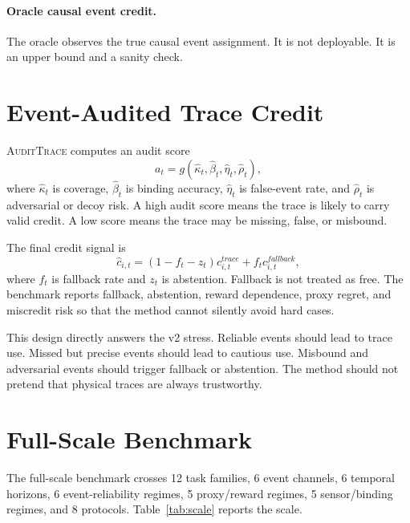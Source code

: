 \documentclass{article}
\newcommand{\method}{\textsc{AuditTrace}\xspace}
\begin{document}
\paragraph{Oracle causal event credit.}
The oracle observes the true causal event assignment. It is not deployable. It is an upper bound and a sanity check.

\section{Event-Audited Trace Credit}

\method computes an audit score
\begin{equation}
    a_t = g(\hat{\kappa}_t,\hat{\beta}_t,\hat{\eta}_t,\hat{\rho}_t),
\end{equation}
where $\hat{\kappa}_t$ is coverage, $\hat{\beta}_t$ is binding accuracy, $\hat{\eta}_t$ is false-event rate, and $\hat{\rho}_t$ is adversarial or decoy risk. A high audit score means the trace is likely to carry valid credit. A low score means the trace may be missing, false, or misbound.

The final credit signal is
\begin{equation}
    \hat{c}_{i,t} =
    (1-f_t-z_t)c^{trace}_{i,t}
    + f_t c^{fallback}_{i,t},
\end{equation}
where $f_t$ is fallback rate and $z_t$ is abstention. Fallback is not treated as free. The benchmark reports fallback, abstention, reward dependence, proxy regret, and miscredit risk so that the method cannot silently avoid hard cases.

This design directly answers the v2 stress. Reliable events should lead to trace use. Missed but precise events should lead to cautious use. Misbound and adversarial events should trigger fallback or abstention. The method should not pretend that physical traces are always trustworthy.

\section{Full-Scale Benchmark}

The full-scale benchmark crosses 12 task families, 6 event channels, 6 temporal horizons, 6 event-reliability regimes, 5 proxy/reward regimes, 5 sensor/binding regimes, and 8 protocols. Table~\ref{tab:scale} reports the scale.

\begin{table}[t]
\centering
\caption{Full-scale benchmark size. Compact rows summarize repeated seeds, scene instances, action motifs, detector calibrations, confounder replicas, trials, and timesteps.}
\label{tab:scale}

\end{table}
\end{document}
